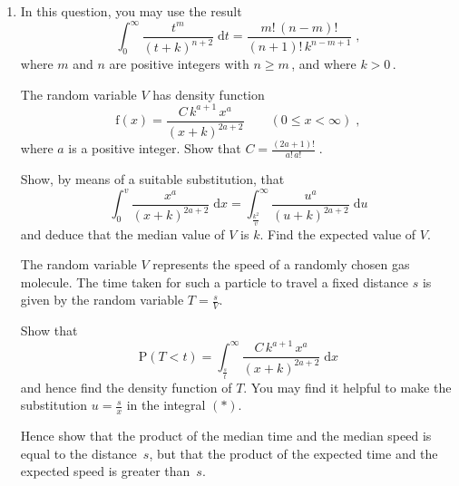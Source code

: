 \documentclass[a4, 11pt]{report}
\newlength{\qspace}
\newcounter{qnumber}
\newenvironment{question}%
 {\vspace{\qspace}
  \begin{enumerate}[\bfseries 1\quad][10]%
    \setcounter{enumi}{\value{qnumber}}%
    \item%
 }
{
  \end{enumerate}
  \filbreak
  \stepcounter{qnumber}
 }
\def\f{{\mathrm f}}
\def\le{\leqslant}
\def\ge{\geqslant}
\newcommand{\ds}{\displaystyle}
\begin{document}
\begin{question}
In this question, 
you may use the result 
\[
\ds \int_0^\infty \frac{t^m}{(t+k)^{n+2}} \; \mathrm{d}t
=\frac{m!\, (n-m)!}{(n+1)! \, k^{n-m+1}}\;,
\]
where $m$ and $n$ are positive integers with $n\ge m\,$,  and where $k>0\,$. 
 
The random variable $V$ has density function 
\[ 
\f(x) 
= \frac{C \, k^{a+1} \, x^a}{(x+k)^{2a+2}} \quad \quad (0 \le x < \infty) \;,
\] 
where $a$ is a positive integer. 
Show that  $\ds C = \frac{(2a+1)!}{a! \, a!}\;$. 
 
Show, by means of a suitable substitution, that 
\[ 
\int_0^v \frac{x^a}{(x+k)^{2a+2}} \; \mathrm{d}x 
= \int_{\frac{k^2}{v}}^\infty \frac{u^a}{(u+k)^{2a+2}} \; \mathrm{d}u  
\] 
and deduce that the median value of $V$ is  $k$. 
Find the expected value of $V$. 
 
The random variable $V$ represents the speed
of a randomly chosen gas molecule. 
The time taken for such a particle to travel a fixed distance $s$ is 
given by the random variable $\ds T=\frac{s}{V}$. 
 
Show that 
\begin{equation}
\mathrm{P}(T<t) = \ds \int_{\frac{s}{t}}^\infty \frac{C \, k^{a+1} \, 
x^a}{(x+k)^{2a+2}}\; \mathrm{d}x 
\tag{$ *$}
\end{equation}
and hence find the density function of $T$. 
You may find it helpful to make the substitution $\ds u = \frac{s}{x}$ 
in the integral $(*)$. 
 
Hence show that the product of the median time 
and the median speed is equal to the distance~$s$, 
but that the product of the 
expected time and the expected speed is greater than~$s$. 

\end{question}
	
\end{document}
